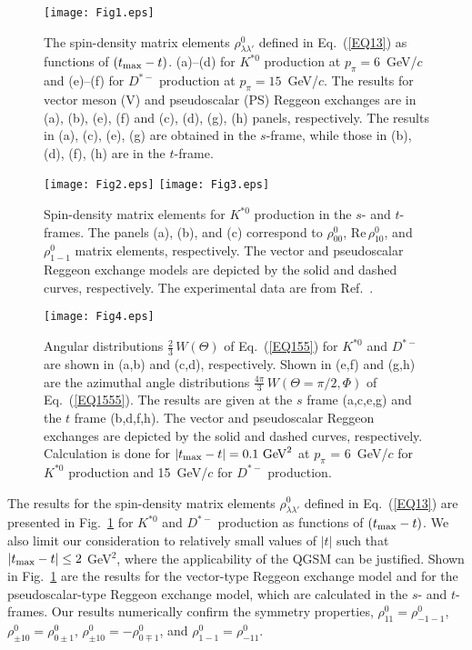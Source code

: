 \documentclass[a4paper,12pt]{article}
\begin{document}
\begin{figure*}[t]
\centering
\texttt{[image: Fig1.eps]}
\caption{The spin-density matrix elements $\rho^0_{\lambda\lambda'}$ defined in Eq.~(\ref{EQ13}) as
functions of $(t_{\rm max} - t)$. (a)--(d) for $K^{*0}$ production at
$p_\pi^{} = 6$~GeV/$c$ and (e)--(f) for $D^{*-}$
production at $p_\pi^{} = 15$~GeV/$c$.
The results for vector meson (V) and pseudoscalar (PS) Reggeon exchanges are in (a), (b), (e), (f)
and (c), (d), (g), (h) panels, respectively.
The results in (a), (c), (e), (g) are obtained in the $s$-frame, while those in (b), (d), (f), (h) are
in the $t$-frame.}
\label{Fig:4}
\end{figure*}



\begin{figure*}[h]
\centering
\texttt{[image: Fig2.eps]}\qquad
\texttt{[image: Fig3.eps]}
\caption{
Spin-density matrix elements for $K^{*0}$ production in the $s$- and $t$-frames.
The panels (a), (b), and (c) correspond to $\rho^0_{00}$, $\mbox{Re}\,\rho^0_{10}$, and $\rho^0_{1-1}$
matrix elements, respectively.
The vector and pseudoscalar Reggeon exchange models are depicted by the solid and dashed curves,
respectively.
The experimental data are from Ref.~\cite{CGLS72}.}
\label{Fig:6}
\end{figure*}


\begin{figure*}[t]
\centering
\texttt{[image: Fig4.eps]}
\caption{
Angular distributions $\frac23\, W(\Theta)$ of Eq.~(\ref{EQ155}) for $K^{*0}$ and $D^{*-}$
are shown in (a,b) and (c,d), respectively.
Shown in (e,f) and (g,h) are the azimuthal angle distributions
$\frac{4\pi}{3}\,W(\Theta=\pi/2,\Phi)$ of Eq.~(\ref{EQ1555}).
The results are given at the $s$ frame (a,c,e,g) and the $t$ frame (b,d,f,h).
The vector and pseudoscalar Reggeon exchanges are depicted by the solid and dashed curves,
respectively.
Calculation is done for $|{t_{\rm max}-t}| = 0.1 \mbox{ GeV}^2$
at $p_\pi^{}$ = 6~GeV/$c$ for $K^{*0}$ production and 15~GeV/$c$ for $D^{*-}$ production.}
\label{Fig:8}
\end{figure*}


The results for the spin-density matrix elements $\rho^0_{\lambda\lambda'}$ defined in
Eq.~(\ref{EQ13}) are presented in Fig.~\ref{Fig:4} for $K^{*0}$  and $D^{*-}$ production
as functions of $(t_{\rm max} - t)$.
We also limit our consideration to relatively small values of $|{t}|$ such that $|{t_{\rm max}-t}| \leq 2$
GeV$^2$, where the applicability of the QGSM can be justified.
Shown in Fig.~\ref{Fig:4} are the results for the vector-type Reggeon exchange model and for
the pseudoscalar-type Reggeon exchange model, which are calculated in the $s$- and $t$-frames.
Our results numerically confirm the symmetry properties,
$\rho^0_{11} = \rho^0_{-1-1}$,  $\rho^0_{\pm1 0}=\rho^0_{0\pm 1}$,
$\rho^0_{\pm 10}=-\rho^0_{0\mp 1}$, and $\rho^0_{1-1}=\rho^0_{-11}$.
\end{document}
